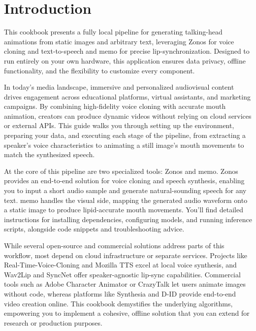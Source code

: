 \section{Introduction}

This cookbook presents a fully local pipeline for generating talking-head animations from static
images and arbitrary text, leveraging \gls{Zonos} for voice cloning and text-to-speech and
\gls{memo} for precise lip-synchronization. Designed to run entirely on your own hardware, this
application ensures data privacy, offline functionality, and the flexibility to customize every
component.

In today's media landscape, immersive and personalized audiovisual content drives engagement across
educational platforms, virtual assistants, and marketing campaigns. By combining high-fidelity voice
cloning with accurate mouth animation, creators can produce dynamic videos without relying on cloud
services or external APIs. This guide walks you through setting up the environment, preparing your
data, and executing each stage of the pipeline, from extracting a speaker's voice characteristics to
animating a still image's mouth movements to match the synthesized speech.

At the core of this pipeline are two specialized tools: \gls{Zonos} and \gls{memo}. \gls{Zonos}
provides an end-to-end solution for voice cloning and speech synthesis, enabling you to input a
short audio sample and generate natural-sounding speech for any text. \gls{memo} handles the visual
side, mapping the generated audio waveform onto a static image to produce lipid-accurate mouth
movements. You'll find detailed instructions for installing dependencies, configuring models, and
running inference scripts, alongside code snippets and troubleshooting advice.

While several open-source and commercial solutions address parts of this workflow, most depend on
cloud infrastructure or separate services. Projects like Real-Time-Voice-Cloning and Mozilla TTS
excel at local voice synthesis, and Wav2Lip and SyncNet offer speaker-agnostic lip-sync
capabilities. Commercial tools such as Adobe Character Animator or CrazyTalk let users animate
images without code, whereas platforms like Synthesia and D-ID provide end-to-end video creation
online. This cookbook demystifies the underlying algorithms, empowering you to implement a cohesive,
offline solution that you can extend for research or production purposes.

